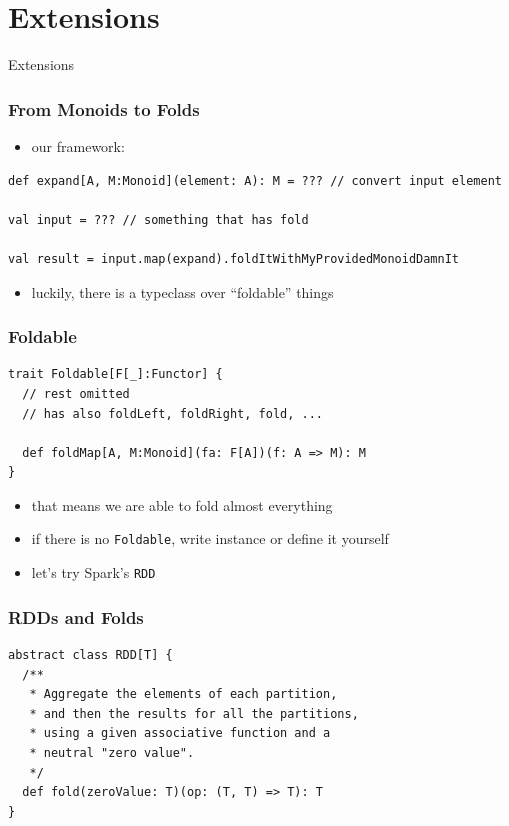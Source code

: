 \documentclass[aspectratio=169]{beamer}
\begin{document}
\section{Extensions}

\begin{frame}
  \begin{center}
    \Huge
    Extensions
  \end{center}
\end{frame}

\begin{frame}[fragile]
  \frametitle{From Monoids to Folds}
  \begin{itemize}
  \item our framework:
  \end{itemize}
  \begin{verbatim}
def expand[A, M:Monoid](element: A): M = ??? // convert input element

val input = ??? // something that has fold

val result = input.map(expand).foldItWithMyProvidedMonoidDamnIt
  \end{verbatim}
  \begin{itemize}
  \item<2> luckily, there is a typeclass over ``foldable'' things
  \end{itemize}
\end{frame}

\begin{frame}[fragile]
  \frametitle{Foldable}
  \begin{verbatim}
trait Foldable[F[_]:Functor] {
  // rest omitted
  // has also foldLeft, foldRight, fold, ...

  def foldMap[A, M:Monoid](fa: F[A])(f: A => M): M
}
  \end{verbatim}

  \begin{itemize}
  \item that means we are able to fold almost everything
  \item if there is no \texttt{Foldable}, write instance or define it yourself
  \item let's try Spark's \texttt{RDD}
  \end{itemize}
\end{frame}

\begin{frame}[fragile]
  \frametitle{RDDs and Folds}
\begin{verbatim}
abstract class RDD[T] {
  /**
   * Aggregate the elements of each partition,
   * and then the results for all the partitions,
   * using a given associative function and a
   * neutral "zero value".
   */
  def fold(zeroValue: T)(op: (T, T) => T): T
}
\end{verbatim}
\end{frame}
\end{document}
